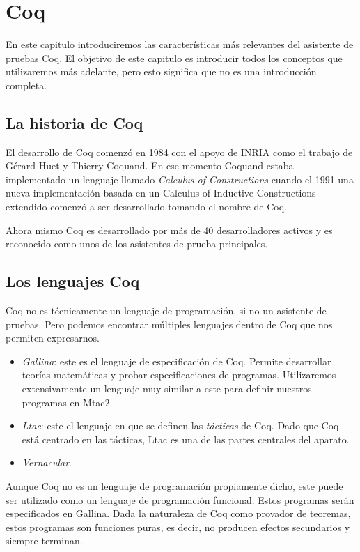 \section{Coq}

En este capitulo introduciremos las características más relevantes del asistente de pruebas Coq. El objetivo de este capitulo es introducir todos los conceptos que utilizaremos más adelante, pero esto significa que no es una introducción completa.

\subsection{La historia de Coq}

El desarrollo de Coq comenzó en 1984 con el apoyo de INRIA como el trabajo de Gérard Huet y Thierry Coquand. En ese momento Coquand estaba implementado un lenguaje llamado \textit{Calculus of Constructions} cuando el 1991 una nueva implementación basada en un Calculus of Inductive Constructions extendido comenzó a ser desarrollado tomando el nombre de Coq.

Ahora mismo Coq es desarrollado por más de 40 desarrolladores activos y es reconocido como unos de los asistentes de prueba principales.

\subsection{Los lenguajes Coq}

Coq no es técnicamente un lenguaje de programación, si no un asistente de pruebas. Pero podemos encontrar múltiples lenguajes dentro de Coq que nos permiten expresarnos. 
\begin{itemize}
    \item \textit{Gallina}: este es el lenguaje de especificación de Coq. Permite desarrollar teorías matemáticas y probar especificaciones de programas. Utilizaremos extensivamente un lenguaje muy similar a este para definir nuestros programas en Mtac2.
    \item \textit{Ltac}: este el lenguaje en que se definen las \textit{tácticas} de Coq. Dado que Coq está centrado en las tácticas, Ltac es una de las partes centrales del aparato.
    \item \textit{Vernacular}.
\end{itemize}

Aunque Coq no es un lenguaje de programación propiamente dicho, este puede ser utilizado como un lenguaje de programación funcional. Estos programas serán especificados en Gallina. Dada la naturaleza de Coq como provador de teoremas, estos programas son funciones puras, es decir, no producen efectos secundarios y siempre terminan.

